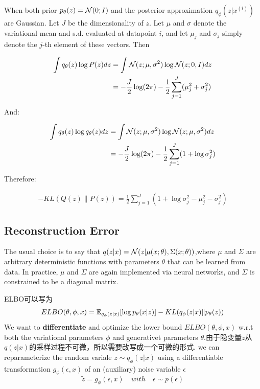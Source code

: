 When both prior $p_{\theta}(z) = \mathcal{N}(0; I)$ and the posterior
approximation $q_{\phi}(z|x^{(i)})$ are Gaussian. Let
$J$ be the dimensionality of $z$. Let $\mu$ and $\sigma$ denote the
variational mean and s.d. evaluated at datapoint $i$, and let $\mu_j$ and
$\sigma_j$ simply denote the $j$-th element of these vectors. Then

\begin{equation}
    \begin{split}
        \int q_{\theta}(z) \log P(z) dz
        &= \int \mathcal{N}(z; \mu, \sigma^2) \log \mathcal{N}(z; 0, I) dz \\
        &= -\frac{J}{2} \log (2\pi) -\frac{1}{2} \sum^J_{j=1}(\mu^2_j + \sigma^2_j)
    \end{split}
\end{equation}

And:

\begin{equation}
    \begin{split}
        \int q_{\theta}(z) \log q_{\theta}(z) d z
        &= \int \mathcal{N}(z; \mu, \sigma^2) \log \mathcal{N}(z; \mu, \sigma^2) dz \\
        &= -\frac{J}{2} \log (2\pi) - \frac{1}{2} \sum^J_{j=1}(1 + \log \sigma^2_j)
    \end{split}
\end{equation}

Therefore:

\begin{equation}
    \begin{split}
        - KL(Q(z)\|P(z)) = \frac{1}{2}\sum^J_{j=1}(1 + \log\sigma_j^2 - \mu_j^2 - \sigma_j^2)
    \end{split}
\end{equation}


\subsection{Reconstruction Error}
The usual choice is to say that $q(z|x) = \mathcal{N}(z| \mu(x; \theta), \Sigma(x; \theta))$,where
$\mu$ and $\Sigma$ are arbitrary deterministic functions with parameters $\theta$ that can be learned from data. In practice, $\mu$ and $\Sigma$
are again implemented via neural networks, and $\Sigma$ is constrained to be a diagonal matrix.

ELBO可以写为
\begin{equation}
    ELBO(\theta, \phi, x)
    = \mathbb{E}_{q_{\phi}(z|x)} [\log p_{\theta}(x | z)]
        - KL(q_{\phi}(z|x)\|p_{\theta}(z))
\end{equation}
We want to \textbf{differentiate} and optimize the lower bound $ELBO(\theta, \phi, x)$ w.r.t both the variational
parameters $\phi$ and generativet parameters $\theta$.由于隐变量$z$从$q(z|x)$的采样过程不可微，所以需要改写成一个可微的形式.
we can reparameterize the random variale $z \sim  q_{\phi}(z|x)$ using a differentiable transformation $g_{\phi}(\epsilon, x)$ of an
(auxiliary) noise variable $\epsilon$
\begin{equation}
    \tilde{z} = g_{\phi}(\epsilon, x) \quad with \quad \epsilon \sim p(\epsilon)
\end{equation}

